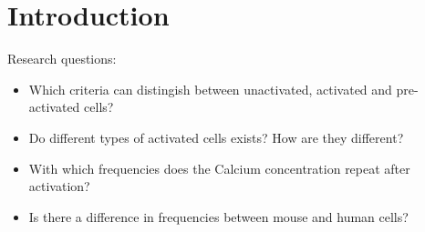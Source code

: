 \chapter{Introduction}
\label{chapter:introduction}

Research questions:
\begin{itemize}
	\item Which criteria can distingish between unactivated, activated and pre-activated cells?
	\item Do different types of activated cells exists? How are they different?
	\item With which frequencies does the Calcium concentration repeat after activation?
	\item Is there a difference in frequencies between mouse and human cells?
\end{itemize}